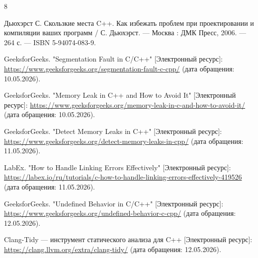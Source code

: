 \documentclass[14pt]{extreport}
\begin{document}

\newpage
\renewcommand{\bibname}{\vspace{-3.2cm}\centering\LargeСписок используемых источников}
\begin{thebibliography}{8}

Дьюхэрст С. Скользкие места C++. Как избежать проблем при проектировании и компиляции ваших программ / С. Дьюхэрст. — Москва : ДМК Пресс, 2006. — 264 с. — ISBN 5-94074-083-9.

GeeksforGeeks. "Segmentation Fault in C/C++" [Электронный ресурс]: 
\href{https://www.geeksforgeeks.org/segmentation-fault-c-cpp/}{https://www.geeksforgeeks.org/segmentation-fault-c-cpp/} 
(дата обращения: 10.05.2026).

GeeksforGeeks. "Memory Leak in C++ and How to Avoid It" [Электронный ресурс]: 
\href{https://www.geeksforgeeks.org/memory-leak-in-c-and-how-to-avoid-it/}{https://www.geeksforgeeks.org/memory-leak-in-c-and-how-to-avoid-it/} 
(дата обращения: 10.05.2026).

GeeksforGeeks. "Detect Memory Leaks in C++" [Электронный ресурс]: 
\href{https://www.geeksforgeeks.org/detect-memory-leaks-in-cpp/}{https://www.geeksforgeeks.org/detect-memory-leaks-in-cpp/} 
(дата обращения: 11.05.2026).

LabEx. "How to Handle Linking Errors Effectively" [Электронный ресурс]: 
\href{https://labex.io/ru/tutorials/c-how-to-handle-linking-errors-effectively-419526}{https://labex.io/ru/tutorials/c-how-to-handle-linking-errors-effectively-419526} 
(дата обращения: 11.05.2026).

GeeksforGeeks. "Undefined Behavior in C/C++" [Электронный ресурс]: 
\href{https://www.geeksforgeeks.org/undefined-behavior-c-cpp/}{https://www.geeksforgeeks.org/undefined-behavior-c-cpp/} 
(дата обращения: 12.05.2026).

Clang-Tidy — инструмент статического анализа для C++ [Электронный ресурс]: \href{https://clang.llvm.org/extra/clang-tidy/}{https://clang.llvm.org/extra/clang-tidy/} 
(дата обращения: 12.05.2026).

\end{thebibliography}
\end{document}
